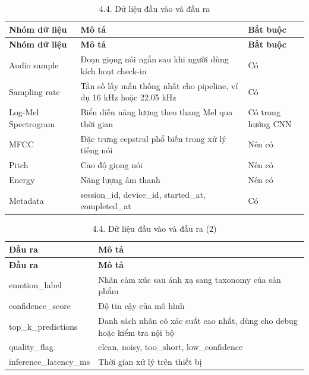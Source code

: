 \documentclass[12pt,a4paper]{article}
\begin{document}
\begin{center}
\begin{longtable}{|P{0.25\textwidth}|P{0.32\textwidth}|P{0.33\textwidth}|}
\caption{4.4. Dữ liệu đầu vào và đầu ra}\\
\hline
\textbf{Nhóm dữ liệu} & \textbf{Mô tả} & \textbf{Bắt buộc} \\
\hline
\endfirsthead
\hline
\textbf{Nhóm dữ liệu} & \textbf{Mô tả} & \textbf{Bắt buộc} \\
\hline
\endhead
Audio sample & Đoạn giọng nói ngắn sau khi người dùng kích hoạt check-in & Có \\
\hline
Sampling rate & Tần số lấy mẫu thống nhất cho pipeline, ví dụ 16 kHz hoặc 22.05 kHz & Có \\
\hline
Log-Mel Spectrogram & Biểu diễn năng lượng theo thang Mel qua thời gian & Có trong hướng CNN \\
\hline
MFCC & Đặc trưng cepstral phổ biến trong xử lý tiếng nói & Nên có \\
\hline
Pitch & Cao độ giọng nói & Nên có \\
\hline
Energy & Năng lượng âm thanh & Nên có \\
\hline
Metadata & session\_id, device\_id, started\_at, completed\_at & Có \\
\hline
\end{longtable}
\end{center}

\begin{center}
\begin{longtable}{|P{0.30\textwidth}|P{0.62\textwidth}|}
\caption{4.4. Dữ liệu đầu vào và đầu ra (2)}\\
\hline
\textbf{Đầu ra} & \textbf{Mô tả} \\
\hline
\endfirsthead
\hline
\textbf{Đầu ra} & \textbf{Mô tả} \\
\hline
\endhead
emotion\_label & Nhãn cảm xúc sau ánh xạ sang taxonomy của sản phẩm \\
\hline
confidence\_score & Độ tin cậy của mô hình \\
\hline
top\_k\_predictions & Danh sách nhãn có xác suất cao nhất, dùng cho debug hoặc kiểm tra nội bộ \\
\hline
quality\_flag & clean, noisy, too\_short, low\_confidence \\
\hline
inference\_latency\_ms & Thời gian xử lý trên thiết bị \\
\hline
\end{longtable}
\end{center}
\end{document}
